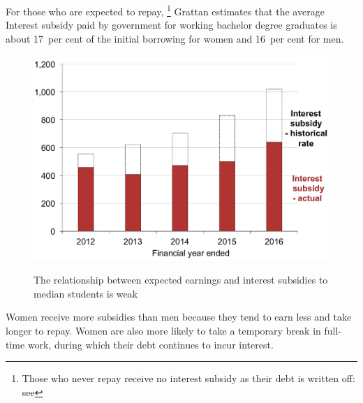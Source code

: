 \documentclass[embargoed]{grattan}
\begin{document}
For those who are expected to repay,%
\footnote{Those who never repay receive no interest subsidy as their debt is written off: see }
Grattan estimates that the average \gls{Interest subsidy} paid by government for working bachelor degree graduates is about 17~per cent of the initial borrowing for women and 16~per cent for men.%

\begin{figure}[H]
\caption{The relationship between expected earnings and interest subsidies to median students is weak}\label{fig:fig9-relationship-expected-earnings-interest-subsides-to-median-students-weak}

\includegraphics[page=9]{atlas/Chartpack.pdf}
%
{\textcites{DET2015FundingClusters}{ABS2012Censuspopulationhousing}}
\end{figure}

Women receive more subsidies than men because they tend to earn less and take longer to repay.
Women are also more likely to take a temporary break in full-time work, during which their debt continues to incur interest.
\end{document}
